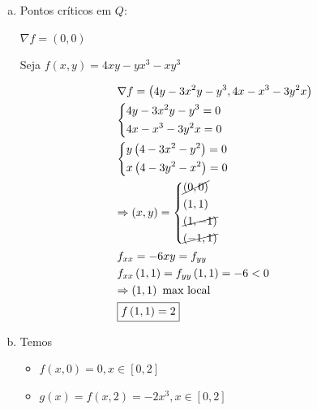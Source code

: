 \documentclass{book}
\begin{document}
\begin{enumerate}
\newpage 

\begin{sol}
  \begin{enumerate}[(a)]
    \item Pontos cr\'iticos em $Q$:

    $\nabla f = (0,0)$

    Seja $f\left( {x,y} \right) = 4xy - yx^3  - xy^3$

\[
\begin{gathered}
  \nabla f = \left( {4y - 3x^2 y - y^3 ,4x - x^3  - 3y^2 x} \right) \hfill \\
  \left\{ \begin{gathered}
  4y - 3x^2 y - y^3  = 0 \hfill \\
  4x - x^3  - 3y^2 x = 0 \hfill \\
\end{gathered}  \right. \hfill \\
  \left\{ \begin{gathered}
  y\left( {4 - 3x^2  - y^2 } \right) = 0 \hfill \\
  x\left( {4 - 3y^2  - x^2 } \right) = 0 \hfill \\
\end{gathered}  \right. \hfill \\
   \Rightarrow \left( {x,y} \right) = \left\{ \begin{gathered}
  \cancel{ \left( {0,0} \right) } \hfill \\
  \left( {1,1} \right) \hfill \\
  \cancel{ \left( {1, - 1} \right) } \hfill \\
  \cancel{ \left( { - 1,1} \right) } \hfill \\
\end{gathered}  \right. \hfill \\
  f_{xx}  =  - 6xy = f_{yy}  \hfill \\
  f_{xx} \left( {1,1} \right) = f_{yy} \left( {1,1} \right) =  - 6 < 0 \hfill \\
   \Rightarrow \left( {1,1} \right){\text{ max local}} \hfill \\
  \boxed{f\left( {1,1} \right) = 2} \hfill \\
\end{gathered}
\]


    \item Temos

    \begin{itemize}
      \item $f(x,0)=0,x \in \left[ {0,2} \right]$
      \item $g(x)=f(x,2)=-2x^3,x \in \left[ {0,2} \right]$


\end{itemize}
\end{enumerate}
\end{sol}
\end{enumerate}
\end{document}
